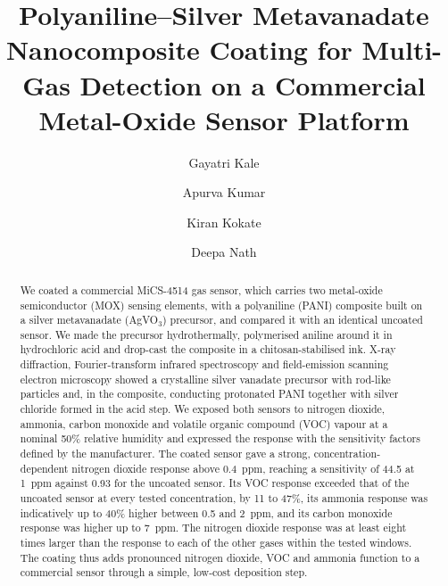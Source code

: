 \documentclass[preprint,11pt]{elsarticle}
\begin{document}
\begin{frontmatter}

\title{Polyaniline--Silver Metavanadate Nanocomposite Coating for Multi-Gas Detection on a Commercial Metal-Oxide Sensor Platform}

\author[a]{Gayatri Kale}
\author[a]{Apurva Kumar}
\author[b]{Kiran Kokate}
\author[a]{Deepa Nath}




\begin{abstract}
We coated a commercial MiCS-4514 gas sensor, which carries two metal-oxide semiconductor (MOX) sensing elements, with a polyaniline (PANI) composite built on a silver metavanadate (AgVO$_3$) precursor, and compared it with an identical uncoated sensor. We made the precursor hydrothermally, polymerised aniline around it in hydrochloric acid and drop-cast the composite in a chitosan-stabilised ink. X-ray diffraction, Fourier-transform infrared spectroscopy and field-emission scanning electron microscopy showed a crystalline silver vanadate precursor with rod-like particles and, in the composite, conducting protonated PANI together with silver chloride formed in the acid step. We exposed both sensors to nitrogen dioxide, ammonia, carbon monoxide and volatile organic compound (VOC) vapour at a nominal 50\% relative humidity and expressed the response with the sensitivity factors defined by the manufacturer. The coated sensor gave a strong, concentration-dependent nitrogen dioxide response above 0.4~ppm, reaching a sensitivity of 44.5 at 1~ppm against 0.93 for the uncoated sensor. Its VOC response exceeded that of the uncoated sensor at every tested concentration, by 11 to 47\%, its ammonia response was indicatively up to 40\% higher between 0.5 and 2~ppm, and its carbon monoxide response was higher up to 7~ppm. The nitrogen dioxide response was at least eight times larger than the response to each of the other gases within the tested windows. The coating thus adds pronounced nitrogen dioxide, VOC and ammonia function to a commercial sensor through a simple, low-cost deposition step.
\end{abstract}


\end{frontmatter}
\end{document}

